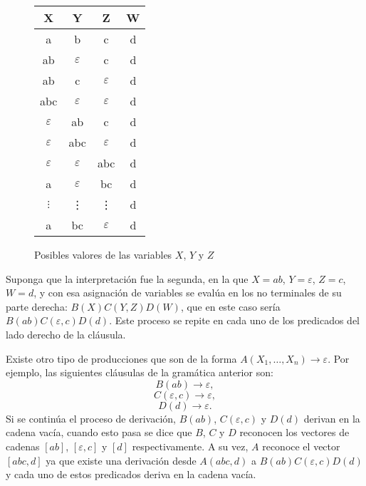 \begin{figure}
    \centering
    \begin{tabular}{|c|c|c|c|}
        \hline
        X             & Y             & Z             & W \\
        \hline
        a             & b             & c             & d \\
        \hline
        ab            & $\varepsilon$ & c             & d \\
        \hline
        ab            & c             & $\varepsilon$ & d \\
        \hline
        abc           & $\varepsilon$ & $\varepsilon$ & d \\
        \hline
        $\varepsilon$ & ab            & c             & d \\
        \hline
        $\varepsilon$ & abc           & $\varepsilon$ & d \\
        \hline
        $\varepsilon$ & $\varepsilon$ & abc           & d \\
        \hline
        a             & $\varepsilon$ & bc            & d \\
        \hline
        $\vdots$      & \vdots        & \vdots        & d \\
        \hline
        a             & bc            & $\varepsilon$ & d \\
        \hline
    \end{tabular}
    \caption{Posibles valores de las variables $X$, $Y$ y $Z$}
    \label{fig:xyz_eaxmple}
\end{figure}

Suponga que la interpretación fue la segunda, en la que $X=ab$, $Y = \varepsilon$, $Z = c$, $W=d$, y con esa asignación de variables se evalúa en los no terminales de su parte derecha: $B(X)C(Y,Z)D(W)$, que en este caso sería $B(ab)C(\varepsilon,c)D(d)$.  Este proceso se repite en cada uno de los predicados del lado derecho de la cláusula.

Existe otro tipo de producciones que son de la forma $A(X_1,\ldots, X_n)\to \varepsilon$. Por ejemplo, las siguientes cláusulas de la gramática anterior son:
$$B(ab)\to \varepsilon,$$
$$C(\varepsilon,c)\to \varepsilon,$$
$$D(d)\to \varepsilon.$$
Si se continúa el proceso de derivación, $B(ab)$, $C(\varepsilon,c)$ y $D(d)$ derivan en la cadena vacía, cuando esto pasa se dice que $B$, $C$ y $D$ reconocen los vectores de cadenas $[ab]$, $[\varepsilon,c]$ y $[d]$ respectivamente. A su vez, $A$ reconoce el vector $[abc,d]$ ya que existe una derivación desde $A(abc,d)$ a $B(ab)C(\varepsilon,c)D(d)$ y cada uno de estos predicados deriva en la cadena vacía.

